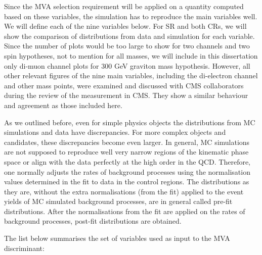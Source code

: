 Since the MVA selection requirement will be applied on a quantity computed based on these variables, the simulation has to  reproduce the main variables well. We will define each of the nine variables below. For SR and both CRs, we will show the comparison of distributions from data and simulation for each variable. Since the number of plots would be too large to show for two channels and two spin hypotheses, not to mention for all masses, we will include in this dissertation only di-muon channel plots for 300 GeV graviton mass hypothesis. However, all other relevant figures of the nine main variables, including the di-electron channel and other mass points,  were examined and discussed with CMS collaborators during the review of the measurement in CMS. They show a similar behaviour and agreement as those included here.
           
As we outlined before, even for simple physics objects the distributions from MC simulations and data have discrepancies. For more complex objects and candidates, these discrepancies become even larger. In general, MC simulations are not supposed to reproduce well very narrow regions of the kinematic phase space or align with the data perfectly at the high order in the QCD. Therefore, one normally adjusts the rates of background processes using the normalisation values determined in the fit to data in the control regions. The distributions as they are, without the extra normalisations (from the fit) applied to the event yields of MC simulated background processes, are in general called pre-fit distributions. After the normalisations from the fit are applied on the rates of background processes, post-fit distributions are obtained. 

The list below summarises the set of variables used as input to the MVA discriminant:

